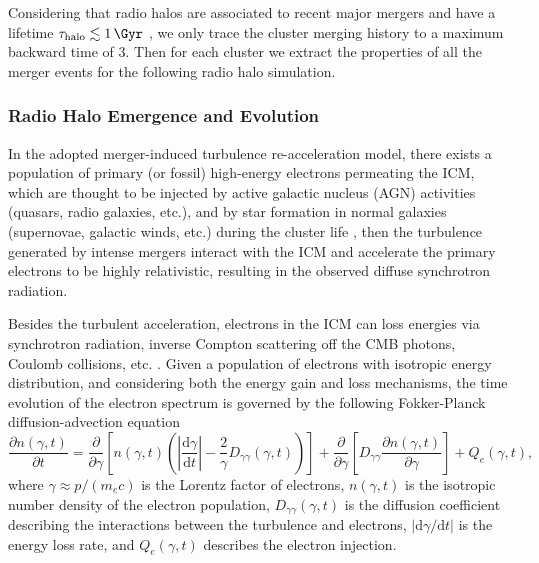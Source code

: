 \documentclass[modern]{aastex62}
\newcommand{\R}[1]{\mathrm{#1}}
\newcommand{\D}[1]{\R{d} #1}
\newcommand{\diff}[2]{\frac{\D{#1}}{\D{#2}}}
\newcommand{\pdiff}[2]{\frac{\partial #1}{\partial #2}}
\begin{document}
Considering that radio halos are associated to recent major mergers and
have a lifetime $\tau_{\R{halo}} \lesssim \SI{1}{\Gyr}$
\citep[e.g.,][]{brunetti2009,cassano2016},
we only trace the cluster merging history to a maximum backward time of
\SI{3}{\Gyr}.
Then for each cluster we extract the properties of all the merger events
for the following radio halo simulation.


\subsubsection{Radio Halo Emergence and Evolution}
\label{sec:halos}

In the adopted merger-induced turbulence re-acceleration model, there
exists a population of primary (or fossil) high-energy electrons permeating
the ICM, which are thought to be injected by active galactic nucleus (AGN)
activities (quasars, radio galaxies, etc.), and by star formation in
normal galaxies (supernovae, galactic winds, etc.) during the cluster
life \citep[see][for a review]{blasi2007rev},
then the turbulence generated by intense mergers interact with the ICM
and accelerate the primary electrons to be highly relativistic, resulting
in the observed diffuse synchrotron radiation.

Besides the turbulent acceleration, electrons in the ICM can loss energies
via synchrotron radiation, inverse Compton scattering off the CMB photons,
Coulomb collisions, etc. \citep{sarazin1999}.
Given a population of electrons with isotropic energy distribution, and
considering both the energy gain and loss mechanisms, the time evolution
of the electron spectrum is governed by the following Fokker-Planck
diffusion-advection equation \citep{eilek1991,schlickeiser2002}
\begin{equation}
  \label{eq:fokkerplanck}
  \pdiff{n(\gamma,t)}{t} = \pdiff{}{\gamma} \left[ n(\gamma,t) \left(
      \left| \diff{\gamma}{t} \right| -
      \frac{2}{\gamma} D_{\gamma\gamma}(\gamma, t) \right) \right] +
    \pdiff{}{\gamma} \left[ D_{\gamma\gamma} \pdiff{n(\gamma,t)}{\gamma}
    \right] + Q_e(\gamma,t),
\end{equation}
where $\gamma \approx p / (m_e c)$ is the Lorentz factor of electrons,
$n(\gamma, t)$ is the isotropic number density of the electron population,
$D_{\gamma\gamma}(\gamma, t)$ is the diffusion coefficient describing
the interactions between the turbulence and electrons,
$|\R{d}\gamma / \R{d}t|$ is the energy loss rate,
and $Q_e(\gamma, t)$ describes the electron injection.
\end{document}
